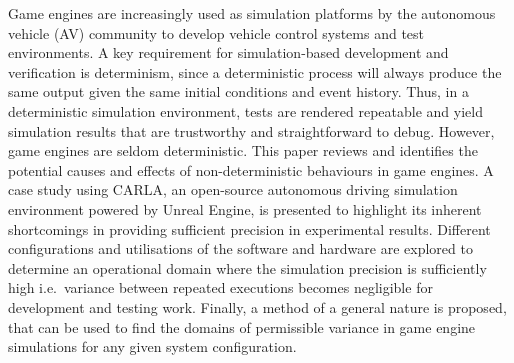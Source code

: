 Game engines are increasingly used as simulation platforms by the autonomous vehicle (AV) community to develop vehicle control systems and test environments. A key requirement for simulation-based development and verification is determinism, since a deterministic process will always produce the same output given the same initial conditions and event history. Thus, in a deterministic simulation environment, tests are rendered repeatable and yield simulation results that are trustworthy and straightforward to debug. However, game engines are seldom deterministic. This paper reviews and identifies the potential causes and effects of non-deterministic behaviours in game engines. A case study using CARLA, an open-source autonomous driving simulation environment powered by Unreal Engine, is presented to highlight its inherent shortcomings in providing sufficient precision in experimental results. Different configurations and utilisations of the software and hardware are explored to determine an operational domain where the simulation precision is sufficiently high i.e.\ variance between repeated executions becomes negligible for development and testing work. Finally, a method of a general nature is proposed, that can be used to find the domains of permissible variance in game engine simulations for any given system configuration.
